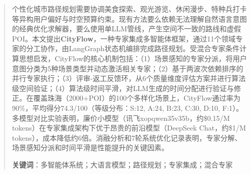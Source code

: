 \renewcommand{\abstractname}{摘\quad 要}
\begin{abstract}
个性化城市路径规划需要协调美食探索、观光游览、休闲漫步、特种兵打卡等异构用户偏好与时空预算约束。现有方法要么依赖无法理解自然语言意图的经典优化求解器，要么使用单LLM管线，产生空间不一致的路线和虚假POI。本文提出\textbf{CityFlow}，一种专家集成多智能体框架，通过11个领域专家的分工协作，由LangGraph状态机编排完成路径规划。受混合专家条件计算思想启发，CityFlow的核心机制包括：（1）场景感知的专家分派，将用户意图分类为5种场景类型并动态激活相关专家；（2）基于两波次依赖排序的并行专家执行；（3）评审-返工反馈环，从6个质量维度评估方案并进行算法级空间验证；（4）算法级时间平滑，对LLM生成的时间分配进行验证与修正。在覆盖珠海（2000+POI）的100个多样化场景上，CityFlow通过率为90\%，平均得分74.3/100（等级分布：S:12, A:24, B:23, C:30, D:10, F:1）。多模型对比实验表明，廉价小模型（讯飞xopqwen35v35b，约\$0.15/M tokens）在专家集成架构下优于昂贵的前沿模型（DeepSeek Chat，约\$1/M tokens），成本降低约6倍。消融分析和7轮系统优化记录表明，专家分解、场景感知分派和时间平滑是性能提升的关键因素。

\textbf{关键词}：多智能体系统；大语言模型；路径规划；专家集成；混合专家
\end{abstract}

